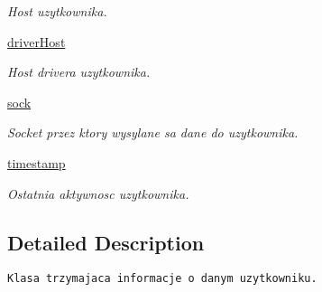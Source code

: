 \begin{CompactItemize}
\begin{CompactList}\small\item\em Host uzytkownika. \item\end{CompactList}\item 
\hypertarget{class_serv_1_1_user_1_1_user_7beeb2284a00949cec3e6012ec84b07b}{
\hyperlink{class_serv_1_1_user_1_1_user_7beeb2284a00949cec3e6012ec84b07b}{driverHost}}
\label{class_serv_1_1_user_1_1_user_7beeb2284a00949cec3e6012ec84b07b}

\begin{CompactList}\small\item\em Host drivera uzytkownika. \item\end{CompactList}\item 
\hypertarget{class_serv_1_1_user_1_1_user_1b29d91b1e55fb1089921d3dbceaf5db}{
\hyperlink{class_serv_1_1_user_1_1_user_1b29d91b1e55fb1089921d3dbceaf5db}{sock}}
\label{class_serv_1_1_user_1_1_user_1b29d91b1e55fb1089921d3dbceaf5db}

\begin{CompactList}\small\item\em Socket przez ktory wysylane sa dane do uzytkownika. \item\end{CompactList}\item 
\hypertarget{class_serv_1_1_user_1_1_user_4361ad465bc018dd14f11d50bf0adad5}{
\hyperlink{class_serv_1_1_user_1_1_user_4361ad465bc018dd14f11d50bf0adad5}{timestamp}}
\label{class_serv_1_1_user_1_1_user_4361ad465bc018dd14f11d50bf0adad5}

\begin{CompactList}\small\item\em Ostatnia aktywnosc uzytkownika. \item\end{CompactList}\end{CompactItemize}


\subsection{Detailed Description}


\footnotesize\begin{verbatim}Klasa trzymajaca informacje o danym uzytkowniku.\end{verbatim}
\normalsize
 

